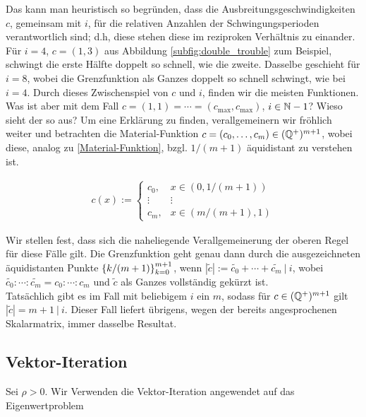Das kann man heuristisch so begründen, dass die Ausbreitungsgeschwindigkeiten $c$, gemeinsam mit $i$, für die relativen Anzahlen der Schwingungsperioden verantwortlich sind; d.h, diese stehen diese im reziproken Verhältnis zu einander. Für $i = 4$, $c = (1, 3)$ aus Abbildung \ref{subfig:double_trouble} zum Beispiel, schwingt die erste Hälfte doppelt so schnell, wie die zweite. Dasselbe geschieht für $i = 8$, wobei die Grenzfunktion als Ganzes doppelt so schnell schwingt, wie bei $i = 4$. Durch dieses Zwischenspiel von $c$ und $i$, finden wir die meisten  Funktionen. \\

Was ist aber mit dem  Fall $c = (1, 1) = \cdots = (c_{\mathrm{max}}, c_{\mathrm{max}})$, $i \in \mathbb{N} - 1$? Wieso sieht der so  aus? Um eine Erklärung zu finden, verallgemeinern wir fröhlich weiter und betrachten die Material-Funktion $c = (c_0, \ldots, c_m) \in (\mathbb{Q}^+)^{m+1}$, wobei diese, analog zu \eqref{Material-Funktion}, bzgl. $1/(m+1)$ äquidistant zu verstehen ist.

\begin{align*}
  c(x) :=
  \begin{cases}
    c_0,   & x \in (0, 1/(m+1)) \\
    \vdots & \vdots \\
    c_m,   & x \in (m/(m+1), 1)
  \end{cases}
\end{align*}

Wir stellen fest, dass sich die naheliegende Verallgemeinerung der oberen Regel für diese Fälle gilt. Die Grenzfunktion geht genau dann durch die ausgezeichneten äquidistanten Punkte ${\left \{ k/(m+1) \right \}}_{k=0}^{m+1}$, wenn $|\tilde{c}| := \tilde{c_0} + \cdots + \tilde{c_m} \: | \: i$, wobei $\tilde{c_0} : \cdots : \tilde{c_m} = c_0 : \cdots : c_m$ und $\tilde{c}$ als Ganzes vollständig gekürzt ist. \\

Tatsächlich gibt es im  Fall mit beliebigem $i$ ein $m$, sodass für $c \in (\mathbb{Q}^+)^{m+1}$ gilt $|\tilde{c}| = m+1 \: | \: i$. Dieser Fall liefert übrigens, wegen der bereits angesprochenen Skalarmatrix, immer dasselbe Resultat.

\subsection{Vektor-Iteration}

Sei $\rho > 0$. Wir Verwenden die Vektor-Iteration angewendet auf das Eigenwertproblem

